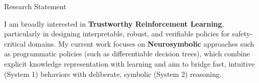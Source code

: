 \begin{rubric}{Research Statement}
\begin{justifying}  %
I am broadly interested in \textbf{Trustworthy Reinforcement Learning}, particularly in designing interpretable, robust, and verifiable policies for safety-critical domains. My current work focuses on \textbf{Neurosymbolic} approaches such as programmatic policies (such as differentiable decision trees), which combine explicit knowledge representation with learning and aim to bridge fast, intuitive (System 1) behaviors with deliberate, symbolic (System 2) reasoning.
\end{justifying}
\end{rubric}

